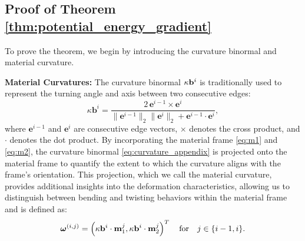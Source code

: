\subsection{Proof of Theorem \ref{thm:potential_energy_gradient}}
\label{appendix: Theorem 1 Proof}
To prove the theorem, we begin by introducing the curvature binormal and material curvature.

\textbf{Material Curvatures:}
The curvature binormal $\kappa\mathbf{b}^i$ is traditionally used to represent the turning angle and axis between two consecutive edges:
\begin{equation}
    \kappa \mathbf{b}^i = \frac{2 \, \mathbf{e}^{i-1} \times \mathbf{e}^{i}}{\|\mathbf{e}^{i-1}\|_2 \|\mathbf{e}^{i}\|_2 + \mathbf{e}^{i-1} \cdot \mathbf{e}^{i}},
   \label{eq:curvature_appendix}
\end{equation}
where \(\mathbf{e}^{i-1}\) and \(\mathbf{e}^i\) are consecutive edge vectors, \(\times\) denotes the cross product, and \(\cdot\) denotes the dot product. 
By incorporating the material frame \eqref{eq:m1} and \eqref{eq:m2}, the curvature binormal \eqref{eq:curvature_appendix} is projected onto the material frame to quantify the extent to which the curvature aligns with the frame's orientation. 
This projection, which we call the material curvature, provides additional insights into the deformation characteristics, allowing us to distinguish between bending and twisting behaviors within the material frame and is defined as:
\begin{equation}
    \bm{\omega}^{(i,j)} = 
    \left(
        \kappa\mathbf{b}^i \cdot \mathbf{m}_1^j 
        , \kappa\mathbf{b}^i \cdot \mathbf{m}_2^j
    \right)^T
    \quad \text{for} \quad j \in \{i-1, i\}.
   \label{eq:materialcurvature}
\end{equation}


